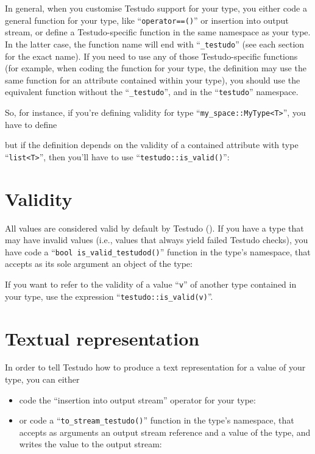 \documentclass[twoside, a4paper, article]{memoir}
\newcommand\typesetexample[1]{%
  \typesetexamplesource{#1}
}
\providecommand\typesetexamplesource[1]{%
}
\begin{document}
In general, when you customise Testudo support for your type, you either code a
general function for your type, like ``\texttt{operator==()}'' or insertion
into output stream, or define a Testudo-specific function in the same namespace
as your type.  In the latter case, the function name will end with
``\texttt{\_testudo}'' (see each section for the exact name).  If you need to
use any of those Testudo-specific functions (for example, when coding the
function for your type, the definition may use the same function for an
attribute contained within your type), you should use the equivalent function
without the ``\texttt{\_testudo}'', and in the ``\texttt{testudo}'' namespace.

So, for instance, if you're defining validity for type
``\texttt{my\_space::MyType<T>}'', you have to define

\typesetexample{testudo-support-my-type-is-valid-testudo}

but if the definition depends on the validity of a contained attribute with
type ``\texttt{list<T>}'', then you'll have to use
``\texttt{testudo::is\_valid()}'':

\typesetexample{testudo-support-my-type-is-valid-testudo-is-valid}


\section{Validity}
\label{sec:validity}

All values are considered valid by default by Testudo
().  If you have a type that may have invalid
values (i.e., values that always yield failed Testudo checks), you have code a
``\texttt{bool is\_valid\_testudod()}'' function in the type's namespace, that
accepts as its sole argument an object of the type:

\typesetexample{testudo-support-my-vector-is-valid-testudo}

If you want to refer to the validity of a value ``\texttt{v}'' of another type
contained in your type, use the expression ``\texttt{testudo::is\_valid(v)}''.

\section{Textual representation}
\label{sec:textual-representation}

In order to tell Testudo how to produce a text representation for a value of
your type, you can either
\begin{itemize}
\item code the ``insertion into output stream'' operator for your type:

  \typesetexample{testudo-support-my-vector-insertion}

\item or code a ``\texttt{to\_stream\_testudo()}'' function in the type's
  namespace, that accepts as arguments an output stream reference and a value
  of the type, and writes the value to the output stream:

  \typesetexample{testudo-support-my-vector-to-stream-testudo}
\end{itemize}
\end{document}
